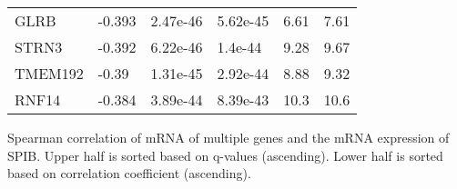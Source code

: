 \begin{table}[!p]
\begin{center}
\begin{tabular}{l|lllll}
        GLRB	&	-0.393	&	2.47e-46	&	5.62e-45	&	6.61	&	7.61\\ 
        STRN3	&	-0.392	&	6.22e-46	&	1.4e-44	&	9.28	&	9.67\\ 
        TMEM192	&	-0.39	&	1.31e-45	&	2.92e-44	&	8.88	&	9.32\\ 
        RNF14	&	-0.384	&	3.89e-44	&	8.39e-43	&	10.3	&	10.6\\ 
    \end{tabular}
    \end{center}
    Spearman correlation of mRNA of multiple genes and the mRNA expression of SPIB. Upper half is sorted based on q-values (ascending). Lower half is sorted based on correlation coefficient (ascending).
    \label{mrna_table}
\end{table} 
    